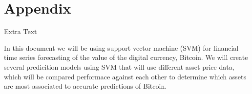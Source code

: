 \appendix

\section{Appendix}

Extra Text

In this document we will be using support vector machine (SVM) for financial time series forecasting of the value of the digital currency, Bitcoin. We will create several predicition models using SVM that will use different asset price data, which will be compared performace against each other to determine which assets are most associated to accurate predictions of Bitcoin.  


